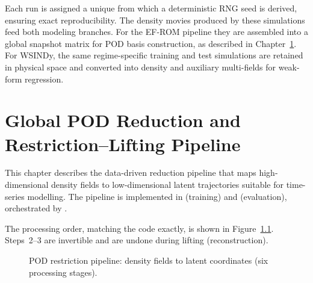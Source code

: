 \documentclass{report}
\theoremstyle{plain}
\theoremstyle{remark}
\numberwithin{equation}{section}              %
\begin{document}
Each run is assigned a unique  from which a deterministic RNG seed
is derived, ensuring exact reproducibility.  The density movies produced by
these simulations feed both modeling branches.  For the EF-ROM pipeline they
are assembled into a global snapshot matrix for POD basis construction, as
described in Chapter~\ref{ch:global_pod_pipeline}.  For WSINDy, the same
regime-specific training and test simulations are retained in physical space
and converted into density and auxiliary multi-fields for weak-form regression.
 
%
\chapter{Global POD Reduction and Restriction--Lifting Pipeline}
\label{ch:global_pod_pipeline}

This chapter describes the data-driven reduction pipeline that maps
high-dimensional density fields to low-dimensional latent trajectories
suitable for time-series modelling.  The pipeline is implemented in
 (training) and
 (evaluation), orchestrated by
.

The processing order, matching the code exactly, is shown in
Figure~\ref{fig:pod_pipeline_flow}.
Steps~2--3 are invertible and are undone during lifting (reconstruction).

\begin{figure}[h]
\centering
{}
\caption{POD restriction pipeline: density fields to latent coordinates (six processing stages).}
\label{fig:pod_pipeline_flow}
\end{figure}
\end{document}
